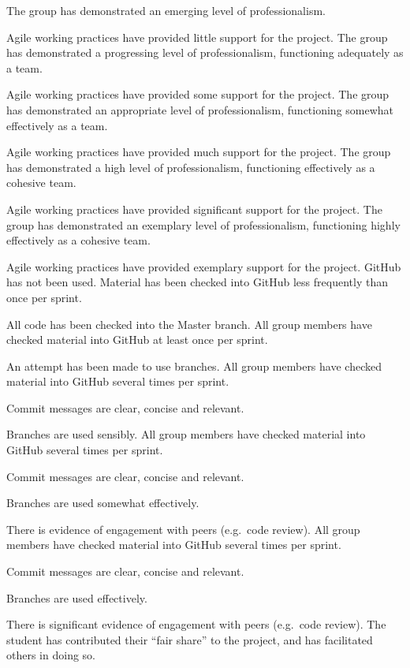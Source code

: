 \documentclass{../fal_assignment}
\begin{document}
\begin{markingrubric}
        \grade The group has demonstrated an emerging level of professionalism.
            \par Agile working practices have provided little support for the project.
        \grade The group has demonstrated a progressing level of professionalism,
            functioning adequately as a team.
            \par Agile working practices have provided some support for the project.
        \grade The group has demonstrated an appropriate level of professionalism,
            functioning somewhat effectively as a team.
            \par Agile working practices have provided much support for the project.
        \grade The group has demonstrated a high level of professionalism,
            functioning effectively as a cohesive team.
            \par Agile working practices have provided significant support for the project.
        \grade The group has demonstrated an exemplary level of professionalism,
            functioning highly effectively as a cohesive team.
            \par Agile working practices have provided exemplary support for the project.
        \grade\fail GitHub has not been used.
        \grade Material has been checked into GitHub less frequently than once per sprint.
            \par All code has been checked into the Master branch.
        \grade All group members have checked material into GitHub at least once per sprint.
            \par An attempt has been made to use branches.
        \grade All group members have checked material into GitHub several times per sprint.
            \par Commit messages are clear, concise and relevant.
            \par Branches are used sensibly.
        \grade All group members have checked material into GitHub several times per sprint.
            \par Commit messages are clear, concise and relevant.
            \par Branches are used somewhat effectively.
            \par There is evidence of engagement with peers (e.g.\ code review).
        \grade All group members have checked material into GitHub several times per sprint.
            \par Commit messages are clear, concise and relevant.
            \par Branches are used effectively.
            \par There is significant evidence of engagement with peers (e.g.\ code review).
        \grade The student has contributed their ``fair share'' to the project,
            and has facilitated others in doing so.
\end{markingrubric}
\end{document}

